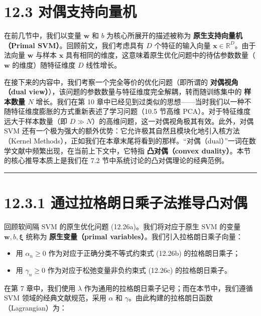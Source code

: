 \section*{12.3 对偶支持向量机}
\label{sec:12.3}

在前几节中，我们以变量 $ \boldsymbol{w} $ 和 $ b $ 为核心所展开的描述被称为 \textbf{原生支持向量机（Primal SVM）}。回顾前文，我们考虑具有 $ D $ 个特征的输入向量 $ \boldsymbol{x} \in \mathbb{R}^D $。由于法向量 $ \boldsymbol{w} $ 与样本 $ \boldsymbol{x} $ 具有相同的维度，这意味着原生优化问题中的待估参数数量（$ \boldsymbol{w} $ 的维度）随特征维度 $ D $ 线性增长。

在接下来的内容中，我们考察一个完全等价的优化问题（即所谓的 \textbf{对偶视角（dual view）}），该问题的参数数量与特征维度完全解耦，转而随训练集中的 \textbf{样本数量 $ N $} 增长。我们在第 10 章中已经见到过类似的思想——当时我们以一种不随特征维度膨胀的方式重新表述了学习问题（10.5 节高维 PCA）。对于特征维度远大于样本数量（即 $ D \gg N $）的高维问题，这一对偶视角极其有效。此外，对偶 SVM 还有一个极为强大的额外优势：它允许极其自然且模块化地引入核方法（Kernel Methods），正如我们在本章末尾将看到的那样。“对偶（dual）”一词在数学文献中频繁出现，在当前上下文中，它特指 \textbf{凸对偶（convex duality）}。本节的核心推导本质上是我们在 7.2 节中系统讨论的凸对偶理论的经典范例。

\medskip\hrule\medskip

\section*{12.3.1 通过拉格朗日乘子法推导凸对偶}

回顾软间隔 SVM 的原生优化问题 (12.26a)。我们将对应于原生 SVM 的变量 $ \boldsymbol{w}, b, \boldsymbol{\xi} $ 统称为 \textbf{原生变量（primal variables）}。我们引入拉格朗日乘子向量：

\begin{itemize}
\item 用 $ \alpha_n \geqslant 0 $ 作为对应于正确分类不等式约束式 (12.26b) 的拉格朗日乘子；
\item 用 $ \gamma_n \geqslant 0 $ 作为对应于松弛变量非负约束式 (12.26c) 的拉格朗日乘子。
\end{itemize}

在第 7 章中，我们使用 $ \lambda $ 作为通用的拉格朗日乘子记号；而在本节中，我们遵循 SVM 领域的经典文献规范，采用 $ \alpha $ 和 $ \gamma $。由此构建的拉格朗日函数（Lagrangian）为：

